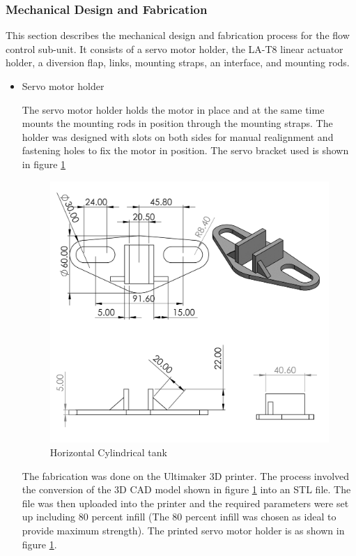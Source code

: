 \subsubsection{Mechanical Design and Fabrication}
\par
This section describes the mechanical design and fabrication process for the flow control sub-unit. It consists of a servo motor holder, the LA-T8 linear actuator holder, a diversion flap, links, mounting straps, an interface, and mounting rods.
\begin{itemize}
    \item Servo motor holder
    \par
The servo motor holder holds the motor in place and at the same time mounts the mounting rods in position through the mounting straps. The holder was designed with slots on both sides for manual realignment and fastening holes to fix the motor in position. The servo bracket used is shown in figure \ref{fig: Servo Holder}
\begin{figure}[H]
        \centering
        \includegraphics{Figures/ServoBracket.JPG}
        \caption{Horizontal Cylindrical tank}
        \label{fig: Servo Holder}
        \end{figure}
\par
The fabrication was done on the Ultimaker 3D printer. The process involved the conversion of the 3D CAD model shown in figure \ref{fig: Servo Holder} into an STL file. The file was then uploaded into the printer and the required parameters were set up including 80 percent infill (The 80 percent infill was chosen as ideal to provide maximum strength). The printed servo motor holder is as shown in figure \ref{fig: Servo Holder}. 

\end{itemize}

